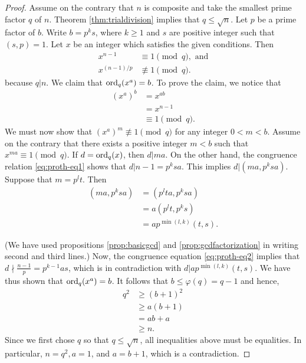 \documentclass{subfiles}
\begin{document}
		\begin{proof}
			Assume on the contrary that $n$ is composite and take the smallest prime factor $q$ of $n$. Theorem \eqref{thm:trialdivision} implies that $q \leq \sqrt n$. Let $p$ be a prime factor of $b$. Write $b=p^ks$, where $k\geq 1$ and $s$ are positive integer such that $(s,p)=1$. Let $x$ be an integer which satisfies the given conditions. Then
					\begin{align}
						x^{n-1} &\equiv 1 \pmod q, \text{ and} \label{eq:proth-eq1}\\
						x^{(n-1)/p} &\not \equiv 1 \pmod q.\label{eq:proth-eq2}
					\end{align}
			because $q|n$. We claim that $\operatorname{ord}_q(x^a)=b$. To prove the claim, we notice that
				\begin{align*}
					\left(x^{a}\right)^b &= x^{ab}\\
						&= x^{n-1}\\
						&\equiv 1 \pmod q. 
				\end{align*}
			We must now show that $\left(x^{a}\right)^m \not \equiv 1 \pmod q$ for any integer $0<m<b$. Assume on the contrary that there exists a positive integer $m<b$ such that $x^{ma} \equiv 1 \pmod q$. If $d=\operatorname{ord}_q(x)$, then $d|ma$. On the other hand, the congruence relation \eqref{eq:proth-eq1} shows that $d|n-1=p^ksa$. This implies $d|(ma, p^ksa)$. Suppose that $m=p^lt$. Then
				\begin{align*}
					\left(ma, p^ksa\right) &= \left(p^lta, p^ksa\right)\\
								&= a \left(p^lt, p^ks\right)\\
								&= a p^{\min(l,k)} (t,s).
				\end{align*}

			(We have used propositions \eqref{prop:basicgcd} and \eqref{prop:gcdfactorization} in writing second and third lines.) Now, the congruence equation \eqref{eq:proth-eq2} implies that $d \nmid \frac{n-1}{p}=p^{k-1}as$, which is in contradiction with $d|a p^{\min(l,k)} (t,s)$. We have thus shown that $\operatorname{ord}_q(x^a)=b$. It follows that $b \leq \varphi(q) = q-1$ and hence,
				\begin{align*}
					q^2 &\geq (b+1)^2\\
						&\geq a(b+1)\\
						&=ab+a\\
						&\geq n.
				\end{align*}
			Since we first chose $q$ so that $q \leq \sqrt n$, all inequalities above must be equalities. In particular, $n=q^2, a=1$, and $a=b+1$, which is a contradiction.
		\end{proof}
		
\end{document}
